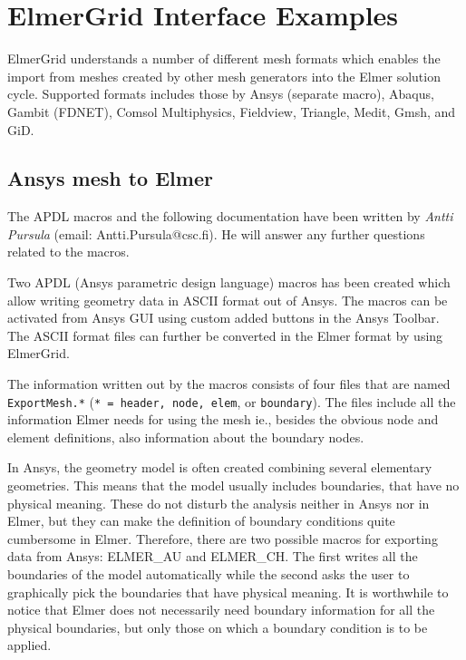 \chapter{ElmerGrid Interface Examples}

ElmerGrid understands a number of different mesh formats which 
enables the import from meshes created by other mesh generators into
the Elmer solution cycle. Supported formats includes those by Ansys (separate macro), 
Abaqus, Gambit (FDNET), Comsol Multiphysics, Fieldview, Triangle, 
Medit, Gmsh, and GiD.

\section{Ansys mesh to Elmer}

The APDL macros and the following documentation have been written
by {\em Antti Pursula} (email: Antti.Pursula@csc.fi). He will 
answer any further questions related to the macros.

Two APDL (Ansys parametric design language) macros has been created
which allow writing geometry data in ASCII format out of Ansys. The
macros can be activated from Ansys GUI using custom added buttons in
the Ansys Toolbar. The ASCII format files can further be converted in
the Elmer format by using ElmerGrid.

The information written out by the macros consists of four files that
are named \texttt{ExportMesh.*} (\texttt{* = header, node, elem}, or
\texttt{boundary}). The files include all the information Elmer needs for using
the mesh ie., besides the obvious node and element definitions, also
information about the boundary nodes. 


In Ansys, the geometry model is often created combining several
elementary geometries. This means that the model usually includes
boundaries, that have no physical meaning. These do not disturb the
analysis neither in Ansys nor in Elmer, but they can make the
definition of boundary conditions quite cumbersome in
Elmer. Therefore, there are two possible macros for exporting data
from Ansys: ELMER\_AU and ELMER\_CH. The first writes all the boundaries
of the model automatically while the second asks the user to
graphically pick the boundaries that have physical meaning. It is
worthwhile to notice that Elmer does not necessarily need boundary
information for all the physical boundaries, but only those on which a
boundary condition is to be applied.

